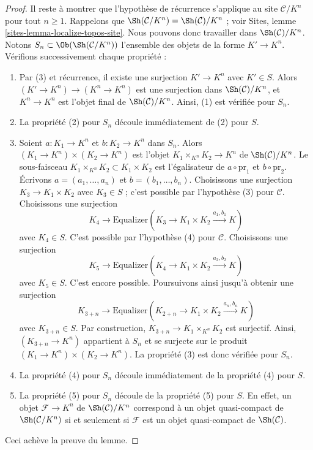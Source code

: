 \begin{proof}
\medskip\noindent
Il reste à montrer que l'hypothèse de récurrence s'applique au site
$\mathcal{C}/K^n$ pour tout $n \geq 1$. Rappelons que
$\Sh(\mathcal{C}/K^n) = \Sh(\mathcal{C})/K^n$ ; voir Sites,
lemme \ref{sites-lemma-localize-topos-site}.
Nous pouvons donc travailler dans $\Sh(\mathcal{C})/K^n$.
Notons $S_n \subset \Ob(\Sh(\mathcal{C}/K^n))$ l'ensemble des objets de la
forme $K' \to K^n$. Vérifions successivement chaque propriété :
\begin{enumerate}
\item Par (3) et récurrence, il existe une surjection $K' \to K^n$ avec
$K' \in S$. Alors $(K' \to K^n) \to (K^n \to K^n)$ est une surjection dans
$\Sh(\mathcal{C})/K^n$, et $K^n \to K^n$ est l'objet final de
$\Sh(\mathcal{C})/K^n$. Ainsi, (1) est vérifiée pour $S_n$.
\item La propriété (2) pour $S_n$ découle immédiatement de (2) pour $S$.
\item Soient $a : K_1 \to K^n$ et $b : K_2 \to K^n$ dans $S_n$.
Alors $(K_1 \to K^n) \times (K_2 \to K^n)$ est l'objet
$K_1 \times_{K^n} K_2 \to K^n$ de $\Sh(\mathcal{C})/K^n$.
Le sous-faisceau $K_1 \times_{K^n} K_2 \subset K_1 \times K_2$ est
l'égalisateur de $a \circ \text{pr}_1$ et $b \circ \text{pr}_2$.
Écrivons $a = (a_1, \ldots, a_n)$ et $b = (b_1, \ldots, b_n)$.
Choisissons une surjection $K_3 \to K_1 \times K_2$ avec $K_3 \in S$ ;
c'est possible par l'hypothèse (3) pour $\mathcal{C}$.
Choisissons une surjection
$$
K_4
\longrightarrow
\text{Equalizer}(K_3 \to K_1 \times K_2 \xrightarrow{a_1, b_1} K)
$$
avec $K_4 \in S$.
C'est possible par l'hypothèse (4) pour $\mathcal{C}$.
Choisissons une surjection
$$
K_5
\longrightarrow
\text{Equalizer}(K_4 \to K_1 \times K_2 \xrightarrow{a_2, b_2} K)
$$
avec $K_5 \in S$.
C'est encore possible. Poursuivons ainsi jusqu'à obtenir une surjection
$$
K_{3 + n}
\longrightarrow
\text{Equalizer}(K_{2 + n} \to K_1 \times K_2 \xrightarrow{a_n, b_n} K)
$$
avec $K_{3 + n} \in S$. Par construction,
$K_{3 + n} \to K_1 \times_{K^n} K_2$
est surjectif. Ainsi, $(K_{3 + n} \to K^n)$ appartient à $S_n$ et se
surjecte sur le produit $(K_1 \to K^n) \times (K_2 \to K^n)$.
La propriété (3) est donc vérifiée pour $S_n$.
\item La propriété (4) pour $S_n$ découle immédiatement de la propriété
(4) pour $S$.
\item La propriété (5) pour $S_n$ découle de la propriété (5) pour $S$.
En effet, un objet $\mathcal{F} \to K^n$ de $\Sh(\mathcal{C})/K^n$
correspond à un objet quasi-compact de $\Sh(\mathcal{C}/K^n)$ si et seulement
si $\mathcal{F}$ est un objet quasi-compact de $\Sh(\mathcal{C})$.
\end{enumerate}
Ceci achève la preuve du lemme.
\end{proof}

